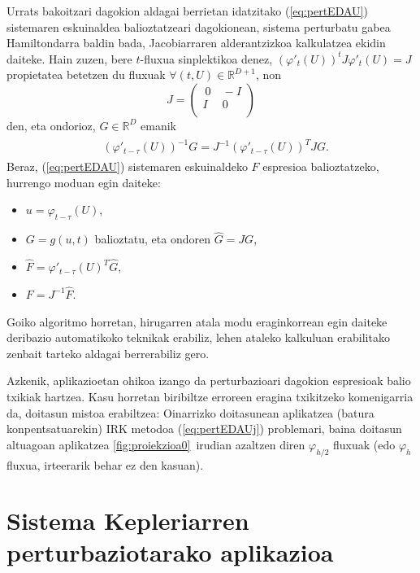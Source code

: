 Urrats bakoitzari dagokion aldagai berrietan idatzitako (\ref{eq:pertEDAU}) sistemaren eskuinaldea balioztatzeari dagokionean, sistema perturbatu gabea Hamiltondarra baldin bada, Jacobiarraren alderantzizkoa kalkulatzea ekidin daiteke.  Hain zuzen, bere $t$-fluxua sinplektikoa denez,  $(\varphi'_{t}(U))^tJ\varphi'_{t}(U)= J$ propietatea betetzen du fluxuak $\forall(t,U) \in \mathbb{R}^{D+1}$, non
\begin{equation*}
 J=\left(\begin{array}{cc}
   \ 0 & \ -I \\
     I & \ 0  \\
\end{array}\right)
\end{equation*}
den, eta  ondorioz, $G \in \mathbb{R}^D$ emanik
%
\begin{align}
\begin{split}
\label{eq:hamEDAU2}
& (\varphi'_{t-\tau}(U) )^{-1} G = J^{-1}(\varphi'_{t-\tau}(U))^{T} J G.
\end{split}
\end{align}
%
Beraz,  (\ref{eq:pertEDAU})  sistemaren eskuinaldeko $F$ espresioa balioztatzeko, hurrengo moduan egin daiteke:
\begin{itemize}
\item $u=\varphi_{t-\tau}(U)$,
\item $G=g(u,t)$ balioztatu, eta ondoren $\widehat G=J G$,
\item $\widehat F = \varphi'_{t-\tau}(U)^{T} \widehat G$,
\item $F = J^{-1} \widehat F$.
\end{itemize}
%
Goiko algoritmo horretan, hirugarren atala modu eraginkorrean egin daiteke deribazio automatikoko teknikak erabiliz, lehen ataleko kalkuluan erabilitako zenbait tarteko aldagai berrerabiliz gero.


Azkenik, aplikazioetan ohikoa izango da perturbazioari dagokion espresioak balio txikiak hartzea. Kasu horretan biribiltze erroreen eragina txikitzeko komenigarria da, doitasun mistoa erabiltzea: Oinarrizko doitasunean aplikatzea (batura konpentsatuarekin) IRK metodoa (\ref{eq:pertEDAUj}) problemari, baina doitasun altuagoan aplikatzea  \ref{fig:proiekzioa0}~irudian azaltzen diren $\varphi_{h/2}$ fluxuak (edo $\varphi_{h}$ fluxua, irteerarik behar ez den kasuan).


\section{Sistema Kepleriarren perturbaziotarako aplikazioa}
\label{s:Keplerrak}

